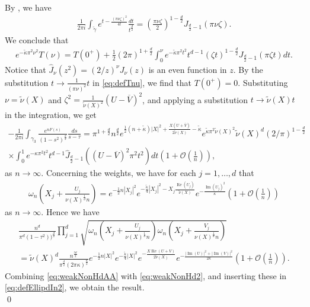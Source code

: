 \documentclass[%
 jmp,
cp,  %
 amsmath,amsthm,amssymb,%
 reprint,%
onecolumn]{revtex4-2}
\begin{document}
By \cite[10.9.19]{DLMF}, we have
\begin{align*}
\frac{1}{2\pi i} \int_{\tilde\gamma} e^{t - \frac{(\pi \nu \zeta)^2}{4 t}} \frac{dt}{t^\frac{d}{2}}
= 
\left(\frac{\pi\nu\zeta}{2}\right)^{1-\frac{d}{2}} J_{\frac{d}{2}-1}(\pi \nu \zeta). 
\end{align*}
We conclude that
\begin{align*}
e^{-\tilde\kappa \pi^2\nu^2} T(\nu) = T(0^+) + \frac12(2 \pi)^{1+\frac{d}{2}} \int_{0}^\nu e^{-\tilde\kappa \pi^2 t^2} t^{d-1} (\zeta t)^{1-\frac{d}{2}} J_{\frac{d}{2}-1}(\pi \zeta t) dt.
\end{align*}
Notice that $\widehat{J}_\nu(z^2)=(2/z)^\nu J_\nu(z)$ is an even function in $z$.
By the substitution $t\to \frac{1}{(\pi \nu)^2}t $ in \eqref{eq:defTnu}, we find that $T(0^+)=0$. 
Substituting $\nu = \tilde\nu(X)$ and $\zeta^2 = \frac{1}{\tilde\nu(X)^2} (U-\overline V)^2$, and applying a substitution $t\to \tilde\nu(X) t$ in the integration, we get
\begin{multline} \label{eq:weakNonHd2}
-\frac{1}{2\pi i} \int_{\gamma_3} \frac{e^{n F(s)}}{(1-s^2)^\frac{d}{2}} \frac{ds}{s-\tau}
=
\pi^{1+\frac{d}{2}} n^\frac{d}{2} e^{\frac{1}{2} (n+\tilde\kappa) \lvert X\rvert^2 + \frac{X(U+\overline V)}{2 \tilde\nu(X)}-\tilde\kappa} 
e^{\tilde\kappa\pi^2\tilde\nu(X)^2} \tilde\nu(X)^{d} 
(2/\pi)^{1-\frac{d}{2}}
\\
\times 
\int_0^{1}  e^{-\kappa \pi^2t^2} t^{d-1} \widehat{J}_{\frac{d}{2}-1}\left((U-\overline V)^2\pi^2 t^2\right) dt
\left(1 + \mathcal O\left(\frac{1}{n}\right)\right),
\end{multline}
as $n\to\infty$. Concerning the weights, we have for each $j=1,\ldots, d$ that
\begin{align*}
\omega_n\left(X_j+\frac{U_j}{\nu(X)^\frac{1}{d} n}\right) 
= e^{-\frac{1}{2} n |X_j|^2} e^{-\frac{\tilde\kappa}{4} |X_j|^2- X_j \frac{\operatorname{Re}(U_j)}{\tilde\nu(X)}}
e^{- \frac{\operatorname{Im}(U_j)^2}{\kappa}} \left(1 + \mathcal O\left(\frac{1}{n}\right)\right)
\end{align*}
as $n\to\infty$. Hence we have
\begin{multline} \label{eq:weakNonHdAA}
\frac{n^d}{\pi^d (1-\tau^2))^\frac{d}{2}}\prod_{j=1}^d \sqrt{\omega_n\left(X_j+\frac{U_j}{\nu(X)^\frac{1}{d} n}\right) \omega_n\left(X_j+\frac{V_j}{\nu(X)^\frac{1}{d} n}\right)}\\
= \tilde\nu(X)^d \frac{n^\frac{3 d}{2}}{\pi^\frac{d}{2} (2\pi \kappa)^\frac{d}{2}} e^{-\frac{1}{2} n \lvert X\rvert^2} 
e^{-\frac{\tilde\kappa}{4} \lvert X\rvert^2} 
e^{- \frac{X \operatorname{Re} (U+V)}{2\tilde\nu(X)}}
e^{- \frac{\lvert \operatorname{Im}(U)\rvert^2+\lvert \operatorname{Im}(V)\rvert^2}{2 \kappa}}
\left(1 + \mathcal O\left(\frac{1}{n}\right)\right).
\end{multline}
Combining \eqref{eq:weakNonHdAA} with \eqref{eq:weakNonHd2}, and inserting these in \eqref{eq:defEllipdIn2}, we obtain the result.\\
\qed
\end{document}
